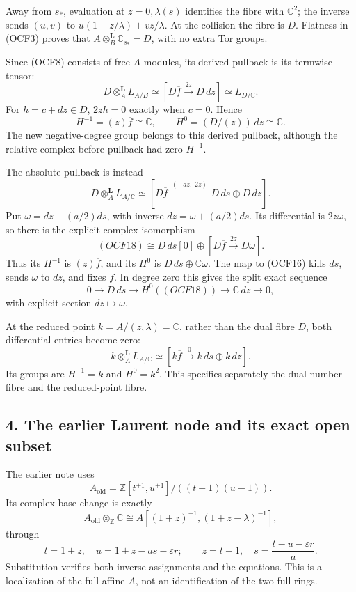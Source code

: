 \documentclass[
]{article}
\begin{document}
Away from \(s_*\), evaluation at \(z=0,\lambda(s)\) identifies the fibre
with \(\mathbb C^2\); the inverse sends \((u,v)\) to
\(u(1-z/\lambda)+vz/\lambda\). At the collision the fibre is \(D\).
Flatness in (OCF3) proves that
\(A\otimes_B^{\mathbf L}\mathbb C_{s_*}=D\), with no extra Tor groups.

Since (OCF8) consists of free \(A\)-modules, its derived pullback is its
termwise tensor: \[
D\otimes_A^{\mathbf L}L_{A/B}
\simeq[D\overline f\xrightarrow{\,2z\,}D\,dz]
\simeq L_{D/\mathbb C}.
\tag{OCF16}
\] For \(h=c+dz\in D\), \(2zh=0\) exactly when \(c=0\). Hence \[
H^{-1}=(z)\overline f\cong\mathbb C,\qquad
H^0=(D/(z))\,dz\cong\mathbb C.
\tag{OCF17}
\] The new negative-degree group belongs to this derived pullback,
although the relative complex before pullback had zero \(H^{-1}\).

The absolute pullback is instead \[
D\otimes_A^{\mathbf L}L_{A/\mathbb C}
\simeq[D\overline f\xrightarrow{\,(-az,\;2z)\,}
 D\,ds\oplus D\,dz].
\tag{OCF18}
\] Put \(\omega=dz-(a/2)ds\), with inverse \(dz=\omega+(a/2)ds\). Its
differential is \(2z\omega\), so there is the explicit complex
isomorphism \[
(OCF18)\cong D\,ds[0]\oplus
[D\overline f\xrightarrow{\,2z\,}D\omega].
\tag{OCF19}
\] Thus its \(H^{-1}\) is \((z)\overline f\), and its \(H^0\) is
\(D\,ds\oplus\mathbb C\omega\). The map to (OCF16) kills \(ds\), sends
\(\omega\) to \(dz\), and fixes \(\overline f\). In degree zero this
gives the split exact sequence \[
0\to D\,ds\to H^0((OCF18))\to\mathbb C\,dz\to0,
\] with explicit section \(dz\mapsto\omega\).

At the reduced point \(k=A/(z,\lambda)=\mathbb C\), rather than the dual
fibre \(D\), both differential entries become zero: \[
k\otimes_A^{\mathbf L}L_{A/\mathbb C}
\simeq[k\overline f\xrightarrow0 k\,ds\oplus k\,dz].
\tag{OCF20}
\] Its groups are \(H^{-1}=k\) and \(H^0=k^2\). This specifies
separately the dual-number fibre and the reduced-point fibre.

\subsection{4. The earlier Laurent node and its exact open
subset}\label{the-earlier-laurent-node-and-its-exact-open-subset}

The earlier note uses \[
A_{\mathrm{old}}=
\mathbb Z[t^{\pm1},u^{\pm1}]/((t-1)(u-1)).
\] Its complex base change is exactly \[
A_{\mathrm{old}}\otimes_{\mathbb Z}\mathbb C
\cong A[(1+z)^{-1},(1+z-\lambda)^{-1}],
\tag{OCF21}
\] through \[
t=1+z,\quad u=1+z-as-\varepsilon r;
\qquad z=t-1,\quad s=\frac{t-u-\varepsilon r}{a}.
\tag{OCF22}
\] Substitution verifies both inverse assignments and the equations.
This is a localization of the full affine \(A\), not an identification
of the two full rings.
\end{document}
